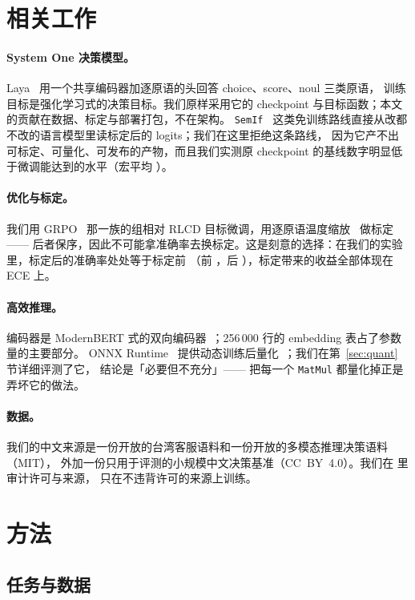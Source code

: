 \documentclass[11pt,a4paper]{article}
\begin{document}
\section{相关工作}

\paragraph{System One 决策模型。} Laya~\cite{laya} 用一个共享编码器加逐原语的头回答 choice、score、noul 三类原语，
训练目标是强化学习式的决策目标。我们原样采用它的 checkpoint 与目标函数；本文的贡献在数据、标定与部署打包，不在架构。
\texttt{SemIf}~\cite{semif} 这类免训练路线直接从改都不改的语言模型里读标定后的 logits；我们在这里拒绝这条路线，
因为它产不出可标定、可量化、可发布的产物，而且我们实测原 checkpoint 的基线数字明显低于微调能达到的水平（宏平均 \OrigAccMacro{}）。

\paragraph{优化与标定。} 我们用 GRPO~\cite{grpo} 那一族的组相对 RLCD 目标微调，用逐原语温度缩放~\cite{calibrated} 做标定 ——
后者保序，因此不可能拿准确率去换标定。这是刻意的选择：在我们的实验里，标定后的准确率处处等于标定前
（前 \MacroAccBefore{}，后 \MacroAcc{}），标定带来的收益全部体现在 ECE 上。

\paragraph{高效推理。} 编码器是 ModernBERT 式的双向编码器~\cite{modernbert}；256\,000 行的 embedding 表占了参数量的主要部分。
ONNX Runtime~\cite{onnxruntime} 提供动态训练后量化~\cite{dynamicquant}；我们在第~\ref{sec:quant} 节详细评测了它，
结论是「必要但不充分」—— 把每一个 \texttt{MatMul} 都量化掉正是弄坏它的做法。

\paragraph{数据。} 我们的中文来源是一份开放的台湾客服语料和一份开放的多模态推理决策语料（MIT），
外加一份只用于评测的小规模中文决策基准（CC~BY~4.0）。我们在  里审计许可与来源，
只在不违背许可的来源上训练。

\section{方法}

\subsection{任务与数据}
\end{document}

